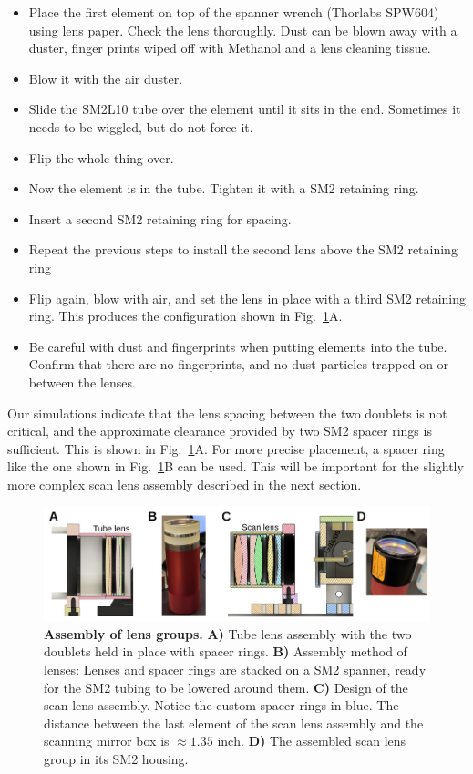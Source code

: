 \documentclass[10pt,letterpaper]{article}
\begin{document}
\begin{itemize}
    \item Place the first element on top of the spanner wrench (Thorlabs SPW604) using lens paper. Check the lens thoroughly. Dust can be blown away with a duster, finger prints wiped off with Methanol and a lens cleaning tissue.
    \item Blow it with the air duster. 
    \item Slide the SM2L10 tube over the element until it sits in the end. Sometimes it needs to be wiggled, but do not force it.
    \item Flip the whole thing over.
    \item Now the element is in the tube. Tighten it with a SM2 retaining ring.
    \item Insert a second SM2 retaining ring for spacing. 
    \item Repeat the previous steps to install the second lens above the SM2 retaining ring
    \item Flip again, blow with air, and set the lens in place with a third SM2 retaining ring. This produces the configuration shown in Fig.~\ref{sfig8}A.
    \item Be careful with dust and fingerprints when putting elements into the tube. Confirm that there are no fingerprints, and no dust particles trapped on or between the lenses.
\end{itemize}
%
Our simulations indicate that the lens spacing between the two doublets is not critical, and the approximate clearance provided by two SM2 spacer rings is sufficient. This is shown in Fig.~\ref{sfig8}A. For more precise placement, a spacer ring like the one shown in Fig.~\ref{sfig8}B can be used. This will be important for the slightly more complex scan lens assembly described in the next section.
%
\begin{figure}[!t]
    \includegraphics[width=\textwidth]{sfig8.jpg}
    \caption{{\bf Assembly of lens groups.} \textbf{A)} Tube lens assembly with the two doublets held in place with spacer rings. \textbf{B)} Assembly method of lenses: Lenses and spacer rings are stacked on a SM2 spanner, ready for the SM2 tubing to be lowered around them. \textbf{C)} Design of the scan lens assembly. Notice the custom spacer rings in blue. The distance between the last element of the scan lens assembly and the scanning mirror box is $\approx 1.35 \text{ inch}$. \textbf{D)} The assembled scan lens group in its SM2 housing.}
    \label{sfig8}
\end{figure}
%
\end{document}
